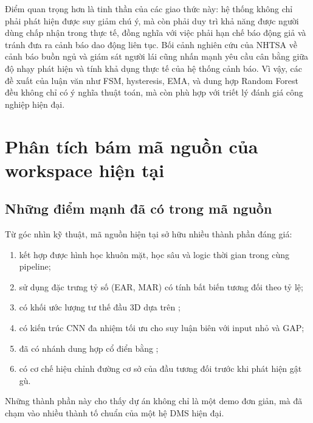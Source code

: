 \documentclass[12pt,a4paper]{article}
\begin{document}
Điểm quan trọng hơn là tinh thần của các giao thức này: hệ thống không chỉ phải phát hiện được suy giảm chú ý, mà còn phải duy trì khả năng được người dùng chấp nhận trong thực tế, đồng nghĩa với việc phải hạn chế báo động giả và tránh đưa ra cảnh báo dao động liên tục. Bối cảnh nghiên cứu của NHTSA về cảnh báo buồn ngủ và giám sát người lái cũng nhấn mạnh yêu cầu cân bằng giữa độ nhạy phát hiện và tính khả dụng thực tế của hệ thống cảnh báo. Vì vậy, các đề xuất của luận văn như FSM, hysteresis, EMA, và dung hợp Random Forest đều không chỉ có ý nghĩa thuật toán, mà còn phù hợp với triết lý đánh giá công nghiệp hiện đại.

\section{Phân tích bám mã nguồn của workspace hiện tại}
\subsection{Những điểm mạnh đã có trong mã nguồn}
Từ góc nhìn kỹ thuật, mã nguồn hiện tại sở hữu nhiều thành phần đáng giá:
\begin{enumerate}[label=\arabic*.]
  \item kết hợp được hình học khuôn mặt, học sâu và logic thời gian trong cùng pipeline;
  \item sử dụng đặc trưng tỷ số (EAR, MAR) có tính bất biến tương đối theo tỷ lệ;
  \item có khối ước lượng tư thế đầu 3D dựa trên ;
  \item có kiến trúc CNN đa nhiệm tối ưu cho suy luận biên với input nhỏ và GAP;
  \item đã có nhánh dung hợp cổ điển bằng ;
  \item có cơ chế hiệu chỉnh đường cơ sở của đầu tương đối trước khi phát hiện gật gù.
\end{enumerate}
Những thành phần này cho thấy dự án không chỉ là một demo đơn giản, mà đã chạm vào nhiều thành tố chuẩn của một hệ DMS hiện đại.
\end{document}
